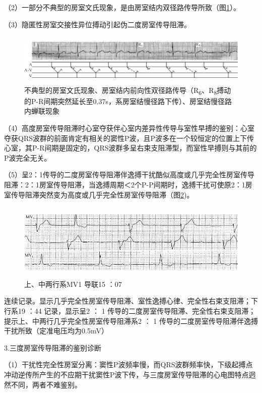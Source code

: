 （2）一部分不典型的房室文氏现象，是由房室结内双径路传导所致（图\ref{fig20-16}）。

（3）隐匿性房室交接性异位搏动引起伪二度房室传导阻滞。

\begin{figure}[!htbp]
 \centering
 \includegraphics[width=5.80208in,height=0.95833in]{./images/Image00345.jpg}
 \captionsetup{justification=centering}
 \caption{不典型的房室文氏现象、房室结内前向性双径路传导（R\textsubscript{6}、R\textsubscript{8}搏动的P-R间期突然延长至0.37s，系房室结慢径路下传）、房室结慢径路内蝉联现象}
 \label{fig20-16}
  \end{figure} 


（4）高度房室传导阻滞时心室夺获伴心室内差异性传导与室性早搏的鉴别：心室夺获QRS波群的前面肯定有相关的窦性P波，且P波多在一个较恒定的位置上下传心室，其P-R间期是固定的，QRS波群多呈右束支阻滞型，而室性早搏则与其前的P波完全无关。

（5）呈2：1传导的二度房室传导阻滞伴逸搏干扰酷似高度或几乎完全性房室传导阻滞：2：1房室传导阻滞，当逸搏周期＜2个P-P间期时，逸搏干扰可使原2：1房室传导阻滞突然变为高度或几乎完全性房室传导阻滞（图\ref{fig20-17})。

\begin{figure}[!htbp]
 \centering
 \includegraphics[width=5.58333in,height=1.44792in]{./images/Image00346.jpg}
 \captionsetup{justification=centering}
 \caption{上、中两行系MV1 导联15 ：07}
 \label{fig20-17}
  \end{figure} 
连续记录。显示几乎完全性房室传导阻滞、室性逸搏心律、完全性右束支阻滞；下行系19
：44 记录，显示呈2 ： 1
传导的二度房室传导阻滞、完全性右束支阻滞；提示上、中两行几乎完全性房室传导阻滞系2
： 1 传导的二度房室传导阻滞伴逸搏干扰所致（定准电压均为0.5mV）

3.三度房室传导阻滞的鉴别诊断

（1）干扰性完全性房室分离：窦性P波频率慢，而QRS波群频率快，下级起搏点冲动逆传所产生的不应期干扰窦性P波下传，与三度房室传导阻滞的心电图特点迥然不同，两者不难鉴别。

